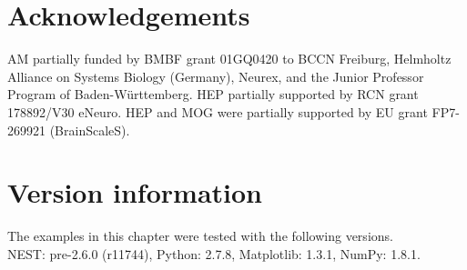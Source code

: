 \documentclass{article}
\begin{document}
\section*{Acknowledgements}
AM partially funded by BMBF grant 01GQ0420 to BCCN Freiburg, Helmholtz
Alliance on Systems Biology (Germany), Neurex, and the Junior
Professor Program of Baden-W\"{u}rttemberg. HEP partially supported by
RCN grant 178892/V30 eNeuro. HEP and MOG were partially supported by EU
grant FP7-269921 (BrainScaleS).


\appendix
\section*{Version information}
The examples in this chapter were tested with the following versions.\\
NEST: pre-2.6.0 (r11744), Python: 2.7.8, Matplotlib: 1.3.1, NumPy: 1.8.1.




\printindex
\end{document}
